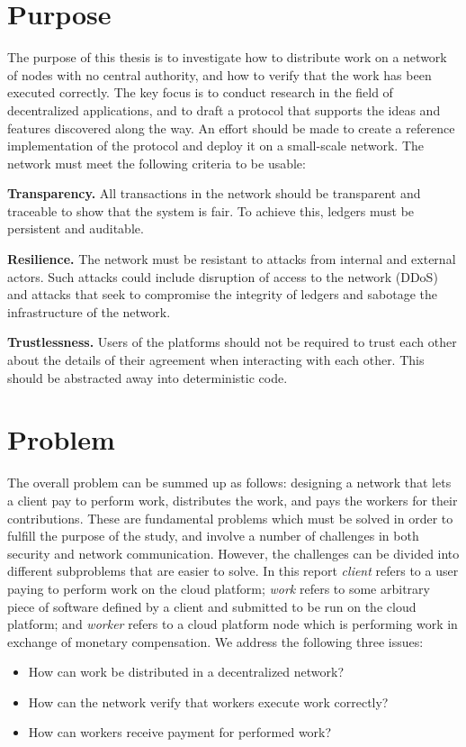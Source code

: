
\section{Purpose}
\label{sec:intro:purpose}
The purpose of this thesis is to investigate how to distribute work on a network of nodes with no central authority, and how to verify that the work has been executed correctly. The key focus is to conduct research in the field of decentralized applications, and to draft a protocol that supports the ideas and features discovered along the way. An effort should be made to create a reference implementation of the protocol and deploy it on a small-scale network. The network must meet the following criteria to be usable:

\textbf{Transparency.} All transactions in the network should be transparent and traceable to show that the system is fair. To achieve this, ledgers must be persistent and auditable.

\textbf{Resilience.} The network must be resistant to attacks from internal and external actors. Such attacks could include disruption of access to the network (DDoS) and attacks that seek to compromise the integrity of ledgers and sabotage the infrastructure of the network.

\textbf{Trustlessness.} Users of the platforms should not be required to trust each other about the details of their agreement when interacting with each other. This should be abstracted away into deterministic code.

\section{Problem}
\label{sec:intro:problem}
The overall problem can be summed up as follows: designing a network that lets a client pay to perform work, distributes the work, and pays the workers for their contributions. These are fundamental problems which must be solved in order to fulfill the purpose of the study, and involve a number of challenges in both security and network communication. However, the challenges can be divided into different subproblems that are easier to solve. In this report \emph{client} refers to a user paying to perform work on the cloud platform; \emph{work} refers to some arbitrary piece of software defined by a client and submitted to be run on the cloud platform; and \emph{worker} refers to a cloud platform node which is performing work in exchange of monetary compensation.
We address the following three issues:
\begin{itemize}
\item How can work be distributed in a decentralized network?
\item How can the network verify that workers execute work correctly?
\item How can workers receive payment for performed work?
\end{itemize}

